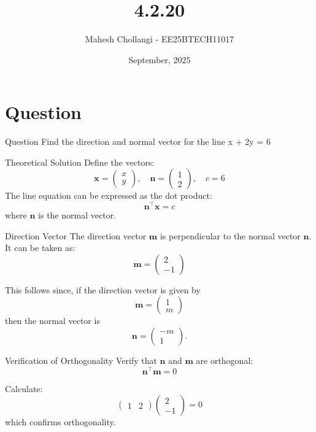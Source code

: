 \documentclass{beamer}
\title{4.2.20}
\date{September, 2025}
\author{Mahesh Chollangi - EE25BTECH11017}
\newcommand{\myvec}[1]{\ensuremath{\begin{pmatrix}#1\end{pmatrix}}}
\renewcommand{\vec}[1]{\boldsymbol{#1}} %
\begin{document}
\frame{\titlepage}

\section*{Question}
\begin{frame}{Question}
Find the direction and normal vector for the line 
    x + 2y = 6
\end{frame}

\begin{frame}{Theoretical Solution}
Define the vectors:
\begin{equation}
  \vec{x} = \myvec{x \\ y}, \quad
    \vec{n} = \myvec{1 \\ 2}, \quad
    c = 6
    \label{eq:vecs_def}
\end{equation}
The line equation can be expressed as the dot product:
\begin{equation}
    \vec{n}^\top \vec{x} = c
    \label{eq:line_vec_eq}
\end{equation}
where \(\vec{n}\) is the normal vector.
\end{frame}

\begin{frame}{Direction Vector}
The direction vector \(\vec{m}\) is perpendicular to the normal vector \(\vec{n}\). It can be taken as:
\begin{equation}
    \vec{m} = \myvec{2 \\ -1}
    \label{eq:direction_vec}
\end{equation}

This follows since, if the direction vector is given by
\begin{equation}
    \vec{m} = \myvec{1 \\ m}
    \label{eq:direction_repr}
\end{equation}
then the normal vector is
\begin{equation}
    \vec{n} = \myvec{-m \\ 1}.
    \label{eq:normal_repr}
\end{equation}
\end{frame}

\begin{frame}{Verification of Orthogonality}
Verify that \(\vec{n}\) and \(\vec{m}\) are orthogonal:
\begin{equation}
    \vec{n}^\top \vec{m} = 0
    \label{eq:orthogonality_cond}
\end{equation}

Calculate:
\begin{equation}
    \myvec{1 & 2} \myvec{2 \\ -1} = 0
    \label{eq:orthogonality_calc}
\end{equation}
which confirms orthogonality.
\end{frame}
\end{document}
